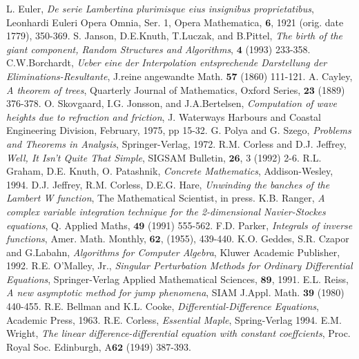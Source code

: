 \begin{thebibliography}{30}
	L. Euler, \textit{De serie Lambertina plurimisque eius insignibus proprietatibus}, Leonhardi Euleri Opera Omnia, Ser. 1, Opera Mathematica, $\pmb{6}$, 1921 (orig. date 1779), 350-369. 
	S. Janson, D.E.Knuth, T.Luczak, and B.Pittel, \textit{The birth of the giant component, Random Structures and Algorithms}, $\pmb{4}$ (1993) 233-358.
	C.W.Borchardt, \textit{Ueber eine der Interpolation entsprechende Darstellung der Eliminations-Resultante}, J.reine angewandte Math. $\pmb{57}$ (1860) 111-121.
	A. Cayley, \textit{A theorem of trees}, Quarterly Journal of Mathematics, Oxford Series, $\pmb{23}$ (1889) 376-378.
	O. Skovgaard, I.G. Jonsson, and J.A.Bertelsen, \textit{Computation of wave heights due to refraction and friction}, J. Waterways Harbours and Coastal Engineering Division, February, 1975, pp 15-32.
	G. Polya and G. Szego, \textit{Problems and Theorems in Analysis}, Springer-Verlag, 1972.
	R.M. Corless and D.J. Jeffrey, \textit{Well, It Isn't Quite That Simple}, SIGSAM Bulletin, $\pmb{26}$, 3 (1992) 2-6.
	R.L. Graham, D.E. Knuth, O. Patashnik, \textit{Concrete Mathematics}, Addison-Wesley, 1994.
	D.J. Jeffrey, R.M. Corless, D.E.G. Hare, \textit{Unwinding the banches of the Lambert W function}, The Mathematical Scientist, in press.
	K.B. Ranger, \textit{A complex variable integration technique for the 2-dimensional Navier-Stockes equations}, Q. Applied Maths, $\pmb{49}$ (1991) 555-562.
	F.D. Parker, \textit{Integrals of inverse functions}, Amer. Math. Monthly, $\pmb{62}$, (1955), 439-440.
	K.O. Geddes, S.R. Czapor and G.Labahn, \textit{Algorithms for Computer Algebra}, Kluwer Academic Publisher, 1992.
	R.E. O'Malley, Jr., \textit{Singular Perturbation Methods for Ordinary Differential Equations}, Springer-Verlag Applied Mathematical Sciences, $\pmb{89}$, 1991.
	E.L. Reiss, \textit{A new asymptotic method for jump phenomena}, SIAM J.Appl. Math. $\pmb{39}$ (1980) 440-455.
	R.E. Bellman and K.L. Cooke, \textit{Differential-Difference Equations}, Academic Press, 1963.
	R.E. Corless, \textit{Essential Maple}, Spring-Verlag 1994.
	E.M. Wright, \textit{The linear difference-differential equation with constant coeffcients}, Proc. Royal Soc. Edinburgh, A$\pmb{62}$ (1949) 387-393.

\end{thebibliography}
